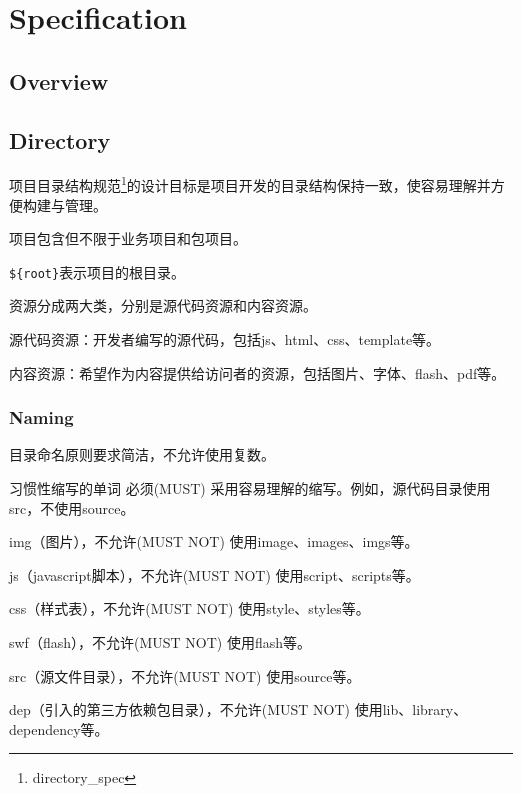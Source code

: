 \part{Specification}



\chapter{Overview}




\chapter{Directory}


项目目录结构规范\footnote{directory_spec}的设计目标是项目开发的目录结构保持一致，使容易理解并方便构建与管理。


\begin{compactitem}
\item 项目包含但不限于业务项目和包项目。
\item \texttt{\$\{root\}}表示项目的根目录。
\end{compactitem}


资源分成两大类，分别是源代码资源和内容资源。

\begin{compactenum}
\item 源代码资源：开发者编写的源代码，包括js、html、css、template等。
\item 内容资源：希望作为内容提供给访问者的资源，包括图片、字体、flash、pdf等。
\end{compactenum}

\section{Naming}


目录命名原则要求简洁，不允许使用复数。

习惯性缩写的单词 必须(MUST) 采用容易理解的缩写。例如，源代码目录使用src，不使用source。

\begin{compactitem}
\item img（图片），不允许(MUST NOT) 使用image、images、imgs等。
\item js（javascript脚本），不允许(MUST NOT) 使用script、scripts等。
\item css（样式表），不允许(MUST NOT) 使用style、styles等。
\item swf（flash），不允许(MUST NOT) 使用flash等。
\item src（源文件目录），不允许(MUST NOT) 使用source等。
\item dep（引入的第三方依赖包目录），不允许(MUST NOT) 使用lib、library、dependency等。
\end{compactitem}

